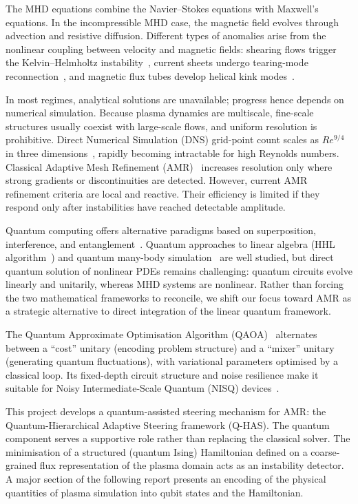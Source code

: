 \documentclass[12pt, a4paper, oneside]{report}
\begin{document}
The MHD equations combine the Navier--Stokes equations with Maxwell's equations. In the incompressible MHD case, the magnetic field evolves through advection and resistive diffusion. Different types of anomalies arise from the nonlinear coupling between velocity and magnetic fields: shearing flows trigger the Kelvin--Helmholtz instability~\cite{chandrasekhar1961}, current sheets undergo tearing-mode reconnection~\cite{furth1963}, and magnetic flux tubes develop helical kink modes~\cite{bateman1978}.

In most regimes, analytical solutions are unavailable; progress hence depends on numerical simulation. Because plasma dynamics are multiscale, fine-scale structures usually coexist with large-scale flows, and uniform resolution is prohibitive. Direct Numerical Simulation (DNS) grid-point count scales as $Re^{9/4}$ in three dimensions~\cite{pope2000}, rapidly becoming intractable for high Reynolds numbers. Classical Adaptive Mesh Refinement (AMR)~\cite{berger1984,berger1989} increases resolution only where strong gradients or discontinuities are detected. However, current AMR refinement criteria are local and reactive. Their efficiency is limited if they respond only after instabilities have reached detectable amplitude.

Quantum computing offers alternative paradigms based on superposition, interference, and entanglement~\cite{nielsen2010}. Quantum approaches to linear algebra (HHL algorithm~\cite{harrow2009}) and quantum many-body simulation~\cite{feynman1982} are well studied, but direct quantum solution of nonlinear PDEs remains challenging: quantum circuits evolve linearly and unitarily, whereas MHD systems are nonlinear. Rather than forcing the two mathematical frameworks to reconcile, we shift our focus toward AMR as a strategic alternative to direct integration of the linear quantum framework.

The Quantum Approximate Optimisation Algorithm (QAOA)~\cite{farhi2014} alternates between a ``cost'' unitary (encoding problem structure) and a ``mixer'' unitary (generating quantum fluctuations), with variational parameters optimised by a classical loop. Its fixed-depth circuit structure and noise resilience make it suitable for Noisy Intermediate-Scale Quantum (NISQ) devices~\cite{preskill2018}.

This project develops a quantum-assisted steering mechanism for AMR: the Quantum-Hierarchical Adaptive Steering framework (Q-HAS). The quantum component serves a supportive role rather than replacing the classical solver. The minimisation of a structured (quantum Ising) Hamiltonian defined on a coarse-grained flux representation of the plasma domain acts as an instability detector. 
A major section of the following report presents an encoding of the physical quantities of plasma simulation into qubit states and the Hamiltonian.
\end{document}
